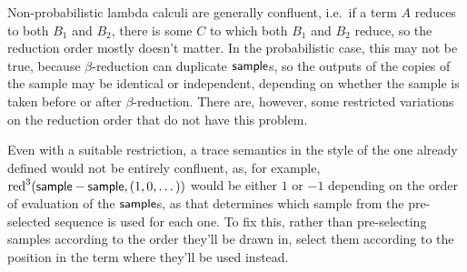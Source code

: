 \medskip
Non-probabilistic lambda calculi are generally confluent, i.e.~if a term $A$ reduces to both $B_1$ and $B_2$, there is some $C$ 
to which both $B_1$ and $B_2$ reduce,
so the reduction order mostly doesn't matter. 
In the probabilistic case, this may not be true, because $\beta$-reduction can duplicate $\mathsf{sample}$s, so the outputs of the copies of the sample may be identical or independent, depending on whether the sample is taken before or after $\beta$-reduction. 
There are, however, some restricted variations on the reduction order that do not have this problem.

Even with a suitable restriction, a trace semantics in the style of the one already defined would not be entirely confluent, as, for example, $\operatorname{red}^3(\mathsf{sample} - \mathsf{sample}, (1,0,\dots))$ would be either $1$ or $-1$ depending on the order of evaluation of the $\mathsf{sample}$s, as that determines which sample from the pre-selected sequence is used for each one. To fix this, rather than pre-selecting samples according to the order they'll be drawn in, select them according to the position in the term where they'll be used instead.

\pagebreak %

